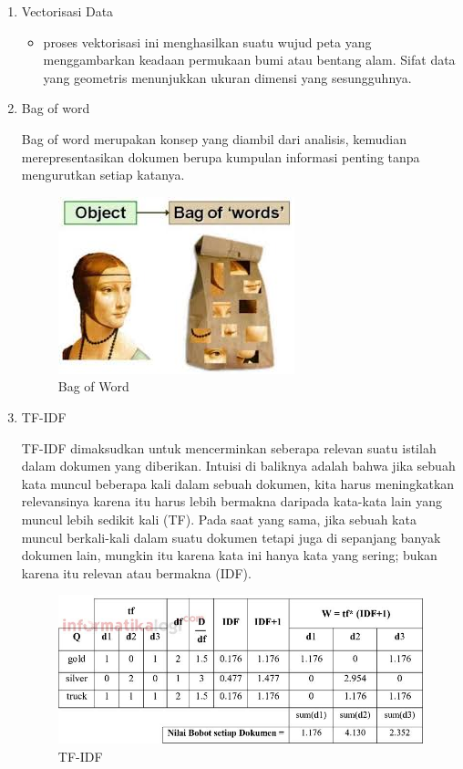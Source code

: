 \begin{enumerate}
\item Vectorisasi Data
	\begin{itemize}
		\item proses vektorisasi ini menghasilkan suatu wujud peta yang menggambarkan keadaan permukaan bumi atau bentang alam. Sifat data yang geometris menunjukkan ukuran dimensi yang sesungguhnya.
	\end{itemize}
	
\item Bag of word
	\par Bag of word merupakan konsep yang diambil dari analisis, kemudian merepresentasikan dokumen berupa kumpulan informasi penting tanpa mengurutkan setiap katanya.
	\begin{figure}[ht]
		\centering
		\includegraphics[scale=0.5]{figures/andi/4-5.jpg}
		\caption{Bag of Word}
		\label{Contoh Ilustrasi}
	\end{figure}
	
\item TF-IDF
	\par TF-IDF dimaksudkan untuk mencerminkan seberapa relevan suatu istilah dalam dokumen yang diberikan. Intuisi di baliknya adalah bahwa jika sebuah kata muncul beberapa kali dalam sebuah dokumen, kita harus meningkatkan relevansinya karena itu harus lebih bermakna daripada kata-kata lain yang muncul lebih sedikit kali (TF). Pada saat yang sama, jika sebuah kata muncul berkali-kali dalam suatu dokumen tetapi juga di sepanjang banyak dokumen lain, mungkin itu karena kata ini hanya kata yang sering; bukan karena itu relevan atau bermakna (IDF).
	\begin{figure}[ht]
		\centering
		\includegraphics[scale=0.5]{figures/andi/4-6.jpg}
		\caption{TF-IDF}
		\label{Contoh Ilustrasi}
	\end{figure}
\end{enumerate}







